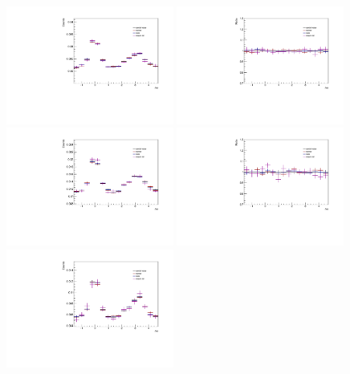 \begin{figure}[ht]
    \centering
    \includegraphics[width=0.49\textwidth]{figures/analysis/pid_variations_dphi_0_20_highpt.pdf}
    \includegraphics[width=0.49\textwidth]{figures/analysis/pid_variations_dphi_0_20_highpt_ratio.pdf}
    \includegraphics[width=0.49\textwidth]{figures/analysis/pid_variations_dphi_20_50_highpt.pdf}
    \includegraphics[width=0.49\textwidth]{figures/analysis/pid_variations_dphi_20_50_highpt_ratio.pdf}
    \includegraphics[width=0.49\textwidth]{figures/analysis/pid_variations_dphi_50_80_highpt.pdf}

\end{figure}
